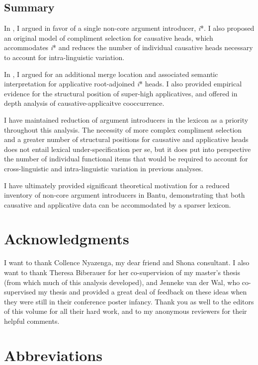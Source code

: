 \documentclass[output=paper]{langscibook}
\begin{document}
\subsection{Summary}\label{sec:wechsler:4.4}

In , I argued in favor of a single non-core argument introducer, \textit{i}*. I also proposed an original model of compliment selection for causative heads, which accommodates \textit{i}* and reduces the number of individual causative heads necessary to account for intra-linguistic variation. 

In , I argued for an additional merge location and associated semantic interpretation for applicative root-adjoined \textit{i}* heads. I also provided empirical evidence for the structural position of super-high applicatives, and offered in depth analysis of causative-applicaitve cooccurrence. 

I have maintained reduction of argument introducers in the lexicon as a priority throughout this analysis. The necessity of more complex compliment selection and a greater number of structural positions for causative and applicative heads does not entail lexical under-specification per se, but it does put into perspective the number of individual functional items that would be required to account for cross-linguistic and intra-linguistic variation in previous analyses. 


I have ultimately provided significant theoretical motivation for a reduced inventory of non-core argument introducers in Bantu, demonstrating that both causative and applicative data can be accommodated by a sparser lexicon. 


\section*{Acknowledgments}\label{sec:wechsler:ack}

I want to thank Collence Nyazenga, my dear friend and Shona consultant. I also want to thank Theresa Biberauer for her co-supervision of my master’s thesis (from which much of this analysis developed), and Jenneke van der Wal, who co-supervised my thesis and provided a great deal of feedback on these ideas when they were still in their conference poster infancy. Thank you as well to the editors of this volume for all their hard work, and to my anonymous reviewers for their helpful comments.  

\section*{Abbreviations}\label{sec:wechsler:abb}
\end{document}
